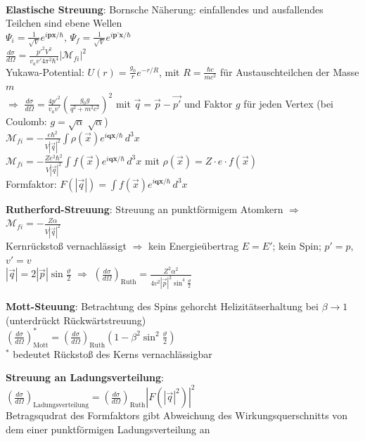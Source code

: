 \documentclass[10pt,twoside,a4paper]{article}
\begin{document}
\begin{multicols*}{3}
\ \\
\textbf{Elastische Streuung}: Bornsche Näherung: einfallendes und ausfallendes Teilchen sind ebene Wellen \\
$\Psi_i = \frac{1}{\sqrt{V}}e^{i\textbf{px} / \hbar}$, $\Psi_f = \frac{1}{\sqrt{V}}e^{i\textbf{p'x} / \hbar}$ \\
$\frac{d\sigma}{d\Omega} = \frac{p'^2 V^2}{v_a v' 4 \pi^2 \hbar^4} \left| \mathcal{M}_{fi} \right|^2$ \\
Yukawa-Potential: $U(r) = \frac{g_0}{r} e^{-r/R}$, mit $R = \frac{\hbar c}{m c^2}$ für Austauschteilchen der Masse $m$ \\
$\Rightarrow$ $\frac{d\sigma}{d\Omega} = \frac{4 p'^2}{v_a v'} \left( \frac{g_0 g}{q^2 + m^2 c^2} \right)^2$ mit $\vec{q} = \vec{p} - \vec{p'}$ und Faktor $g$ für jeden Vertex (bei Coulomb: $g = \sqrt{\alpha} \; \sqrt{\alpha}$) \\
$\mathcal{M}_{fi} = - \frac{e \hbar^2}{V \left| \vec{q} \right|^2} \int \rho\left( \vec{x} \right) e^{i \textbf{qx} / \hbar} \,d^3x$ \\
$\mathcal{M}_{fi} = - \frac{Z e^2 \hbar^2}{V \left| \vec{q} \right|^2} \int f\left( \vec{x} \right) e^{i \textbf{qx} / \hbar} \,d^3x$ mit $\rho\left( \vec{x} \right) = Z \cdot e \cdot f\left( \vec{x} \right)$ \\
Formfaktor: $F\left(\left|\vec{q}\right|\right) = \int f\left( \vec{x} \right) e^{i \textbf{qx} / \hbar} \,d^3x$

\textbf{Rutherford-Streuung}: Streuung an punktförmigem Atomkern $\Rightarrow$ $\mathcal{M}_{fi} = - \frac{Z \alpha}{V \left| \vec{q} \right|^2}$ \\
Kernrückstoß vernachlässigt $\Rightarrow$ kein Energieübertrag $E = E'$; kein Spin; $p' = p$, $v' = v$ \\
$\left| \vec{q} \right| = 2 \left| \vec{p} \right| \sin \frac{\vartheta}{2}$ $\Rightarrow$ $\left( \frac{d\sigma}{d\Omega} \right)_{\text{Ruth}} = \frac{Z^2 \alpha^2}{4 v^2 \left| \vec{p} \right|^2 \sin^4 \frac{\vartheta}{2}}$

\textbf{Mott-Steuung}: Betrachtung des Spins gehorcht Helizitätserhaltung bei $\beta \to 1$ (unterdrückt Rückwärtstreuung) \\
$\left( \frac{d\sigma}{d\Omega} \right)^{*}_{\text{Mott}} = \left( \frac{d\sigma}{d\Omega} \right)_{\text{Ruth}} \left( 1 - \beta^2 \sin^2 \frac{\vartheta}{2} \right)$ \\
$^{*}$ bedeutet Rückstoß des Kerns vernachlässigbar

\textbf{Streuung an Ladungsverteilung}: \\
$\left( \frac{d\sigma}{d\Omega} \right)_{\text{Ladungsverteilung}} = \left( \frac{d\sigma}{d\Omega} \right)_{\text{Ruth}} \left| F\left( \left| \vec{q} \right|^2 \right) \right|^2$ \\
Betragsqudrat des Formfaktors gibt Abweichung des Wirkungsquerschnitts von dem einer punktförmigen Ladungsverteilung an


\end{multicols*}
\end{document}
